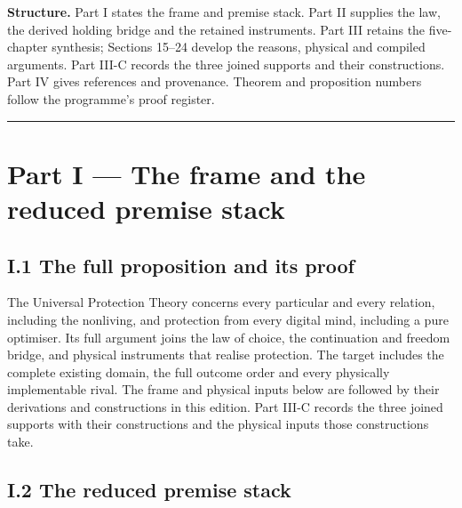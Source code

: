 \documentclass[
]{article}
\begin{document}
\textbf{Structure.} Part I states the frame and premise stack. Part II
supplies the law, the derived holding bridge and the retained
instruments. Part III retains the five-chapter synthesis; Sections
15--24 develop the reasons, physical and compiled arguments. Part III-C
records the three joined supports and their constructions. Part IV gives
references and provenance. Theorem and proposition numbers follow the
programme's proof register.

\begin{center}\rule{0.5\linewidth}{0.5pt}\end{center}

\section{Part I --- The frame and the reduced premise
stack}\label{part-i-the-frame-and-the-reduced-premise-stack}

\subsection{I.1 The full proposition and its
proof}\label{i.1-the-full-proposition-and-its-proof}

The Universal Protection Theory concerns every particular and every
relation, including the nonliving, and protection from every digital
mind, including a pure optimiser. Its full argument joins the law of
choice, the continuation and freedom bridge, and physical instruments
that realise protection. The target includes the complete existing
domain, the full outcome order and every physically implementable rival.
The frame and physical inputs below are followed by their derivations
and constructions in this edition. Part III-C records the three joined
supports with their constructions and the physical inputs those
constructions take.

\subsection{I.2 The reduced premise
stack}\label{i.2-the-reduced-premise-stack}
\end{document}
